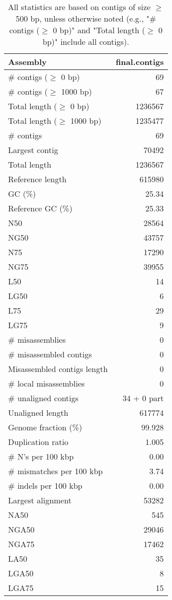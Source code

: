 \documentclass[12pt,a4paper]{article}
\begin{document}
\begin{table}[ht]
\begin{center}
\caption{All statistics are based on contigs of size $\geq$ 500 bp, unless otherwise noted (e.g., "\# contigs ($\geq$ 0 bp)" and "Total length ($\geq$ 0 bp)" include all contigs).}
\begin{tabular}{|l*{1}{|r}|}
\hline
Assembly & final.contigs \\ \hline
\# contigs ($\geq$ 0 bp) & 69 \\ \hline
\# contigs ($\geq$ 1000 bp) & 67 \\ \hline
Total length ($\geq$ 0 bp) & 1236567 \\ \hline
Total length ($\geq$ 1000 bp) & 1235477 \\ \hline
\# contigs & 69 \\ \hline
Largest contig & 70492 \\ \hline
Total length & 1236567 \\ \hline
Reference length & 615980 \\ \hline
GC (\%) & 25.34 \\ \hline
Reference GC (\%) & 25.33 \\ \hline
N50 & 28564 \\ \hline
NG50 & 43757 \\ \hline
N75 & 17290 \\ \hline
NG75 & 39955 \\ \hline
L50 & 14 \\ \hline
LG50 & 6 \\ \hline
L75 & 29 \\ \hline
LG75 & 9 \\ \hline
\# misassemblies & 0 \\ \hline
\# misassembled contigs & 0 \\ \hline
Misassembled contigs length & 0 \\ \hline
\# local misassemblies & 0 \\ \hline
\# unaligned contigs & 34 + 0 part \\ \hline
Unaligned length & 617774 \\ \hline
Genome fraction (\%) & 99.928 \\ \hline
Duplication ratio & 1.005 \\ \hline
\# N's per 100 kbp & 0.00 \\ \hline
\# mismatches per 100 kbp & 3.74 \\ \hline
\# indels per 100 kbp & 0.00 \\ \hline
Largest alignment & 53282 \\ \hline
NA50 & 545 \\ \hline
NGA50 & 29046 \\ \hline
NGA75 & 17462 \\ \hline
LA50 & 35 \\ \hline
LGA50 & 8 \\ \hline
LGA75 & 15 \\ \hline
\end{tabular}
\end{center}
\end{table}
\end{document}
